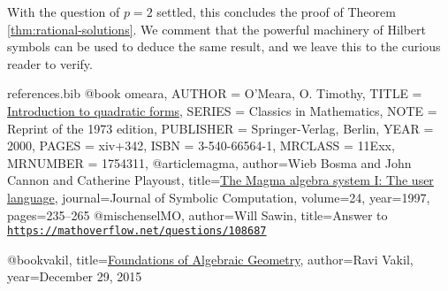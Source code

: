 \documentclass[10pt,a4paper]{amsart}
\numberwithin{equation}{section}
\numberwithin{figure}{section}
\numberwithin{table}{section}
\theoremstyle{definition}
\theoremstyle{plain}
\theoremstyle{remark}
\theoremstyle{plain}
\theoremstyle{definition}
\theoremstyle{plain}
\theoremstyle{plain}
\begin{document}
	With the question of $p=2$ settled, this concludes the proof of Theorem \ref{thm:rational-solutions}. We comment that the powerful machinery of Hilbert symbols can be used to deduce the same result, and we leave this to the curious reader to verify.
	\begin{filecontents}{references.bib}
		@book {omeara,
			AUTHOR = {O'Meara, O. Timothy},
			TITLE = {\href{https://link.springer.com/book/10.1007\%2F978-3-642-62031-7}{Introduction to quadratic forms}},
			SERIES = {Classics in Mathematics},
			NOTE = {Reprint of the 1973 edition},
			PUBLISHER = {Springer-Verlag, Berlin},
			YEAR = {2000},
			PAGES = {xiv+342},
			ISBN = {3-540-66564-1},
			MRCLASS = {11Exx},
			MRNUMBER = {1754311},
		}
		@article{magma,
			author={Wieb Bosma and John Cannon and Catherine Playoust},
			title={\href{http://www.sciencedirect.com/science/article/pii/S074771719690125X}{The Magma algebra system {I}: The user language}},
			journal={Journal of Symbolic Computation},
			volume={24},
			year={1997},
			pages={235--265}
		}
		@misc{henselMO,
			author={Will Sawin},
			title={Answer to \href{https://mathoverflow.net/questions/108687}{\texttt{https://mathoverflow.net/questions/108687}}}
		}
		
		@book{vakil,
			title={\href{http://math.stanford.edu/~vakil/216blog/index.html}{Foundations of Algebraic Geometry}},
			author={Ravi Vakil},
			year={December 29, 2015}
		}
	\end{filecontents}
	
	
	
	
\end{document}

